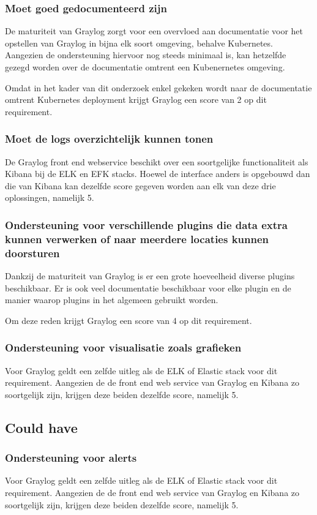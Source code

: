 \subsubsection{Moet goed gedocumenteerd zijn}
De maturiteit van Graylog zorgt voor een overvloed aan documentatie voor het opstellen van Graylog in bijna elk soort omgeving, behalve Kubernetes. Aangezien de ondersteuning hiervoor nog steeds minimaal is, kan hetzelfde gezegd worden over de documentatie omtrent een Kubenernetes omgeving.

Omdat in het kader van dit onderzoek enkel gekeken wordt naar de documentatie omtrent Kubernetes deployment krijgt Graylog een score van 2 op dit requirement.

\subsubsection{Moet de logs overzichtelijk kunnen tonen}
De Graylog front end webservice beschikt over een soortgelijke functionaliteit als Kibana bij de ELK en EFK stacks. Hoewel de interface anders is opgebouwd dan die van Kibana kan dezelfde score gegeven worden aan elk van deze drie oplossingen, namelijk 5.

\subsubsection{Ondersteuning voor verschillende plugins die data extra kunnen verwerken of naar meerdere locaties kunnen doorsturen}
Dankzij de maturiteit van Graylog is er een grote hoeveelheid diverse plugins beschikbaar. Er is ook veel documentatie beschikbaar voor elke plugin en de manier waarop plugins in het algemeen gebruikt worden.

Om deze reden krijgt Graylog een score van 4 op dit requirement.

\subsubsection{Ondersteuning voor visualisatie zoals grafieken}
Voor Graylog geldt een zelfde uitleg als de ELK of Elastic stack voor dit requirement. Aangezien de de front end web service van Graylog en Kibana zo soortgelijk zijn, krijgen deze beiden dezelfde score, namelijk 5.

\subsection{Could have}
\subsubsection{Ondersteuning voor alerts}
Voor Graylog geldt een zelfde uitleg als de ELK of Elastic stack voor dit requirement. Aangezien de de front end web service van Graylog en Kibana zo soortgelijk zijn, krijgen deze beiden dezelfde score, namelijk 5.

